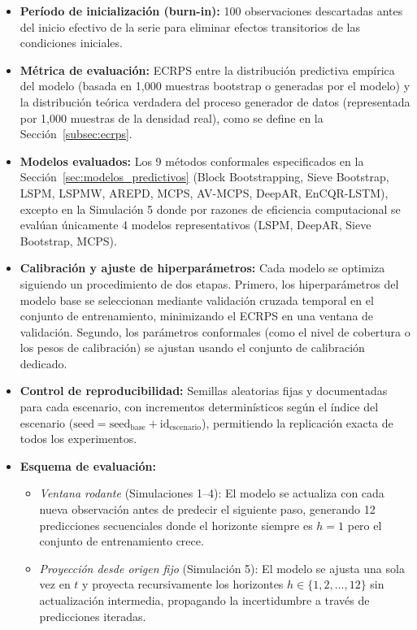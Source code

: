 \begin{itemize}
\item \textbf{Período de inicialización (burn-in):} 100 observaciones descartadas antes del inicio efectivo de la serie para eliminar efectos transitorios de las condiciones iniciales.

\item \textbf{Métrica de evaluación:} ECRPS entre la distribución predictiva empírica del modelo (basada en 1,000 muestras bootstrap o generadas por el modelo) y la distribución teórica verdadera del proceso generador de datos (representada por 1,000 muestras de la densidad real), como se define en la Sección~\ref{subsec:ecrps}.

\item \textbf{Modelos evaluados:} Los 9 métodos conformales especificados en la Sección~\ref{sec:modelos_predictivos} (Block Bootstrapping, Sieve Bootstrap, LSPM, LSPMW, AREPD, MCPS, AV-MCPS, DeepAR, EnCQR-LSTM), excepto en la Simulación 5 donde por razones de eficiencia computacional se evalúan únicamente 4 modelos representativos (LSPM, DeepAR, Sieve Bootstrap, MCPS).

\item \textbf{Calibración y ajuste de hiperparámetros:} Cada modelo se optimiza siguiendo un procedimiento de dos etapas. Primero, los hiperparámetros del modelo base se seleccionan mediante validación cruzada temporal en el conjunto de entrenamiento, minimizando el ECRPS en una ventana de validación. Segundo, los parámetros conformales (como el nivel de cobertura o los pesos de calibración) se ajustan usando el conjunto de calibración dedicado. 

\item \textbf{Control de reproducibilidad:} Semillas aleatorias fijas y documentadas para cada escenario, con incrementos determinísticos según el índice del escenario ($\text{seed} = \text{seed}_{\text{base}} + \text{id}_{\text{escenario}}$), permitiendo la replicación exacta de todos los experimentos.

\item \textbf{Esquema de evaluación:} 
\begin{itemize}
    \item \textit{Ventana rodante} (Simulaciones 1--4): El modelo se actualiza con cada nueva observación antes de predecir el siguiente paso, generando 12 predicciones secuenciales donde el horizonte siempre es $h=1$ pero el conjunto de entrenamiento crece.
    \item \textit{Proyección desde origen fijo} (Simulación 5): El modelo se ajusta una sola vez en $t$ y proyecta recursivamente los horizontes $h \in \{1, 2, \ldots, 12\}$ sin actualización intermedia, propagando la incertidumbre a través de predicciones iteradas.
\end{itemize}


\end{itemize}
